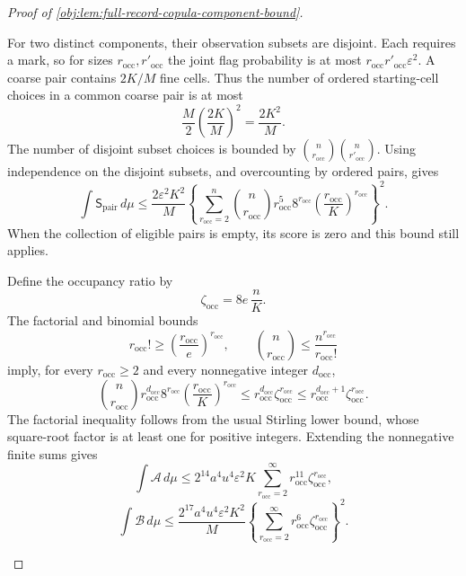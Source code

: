 \documentclass[11pt]{article}
\begin{document}
\begin{proof}[Proof of \cref{obj:lem:full-record-copula-component-bound}]
\begin{enumerate}
For two distinct components, their observation subsets are disjoint. Each requires a mark, so for sizes
\(r_{\mathrm{occ}},r'_{\mathrm{occ}}\) the joint flag probability is at most
\(r_{\mathrm{occ}}r'_{\mathrm{occ}}\varepsilon^2\). A coarse pair contains
\(2K/M\) fine cells. Thus the number of ordered starting-cell choices in a common coarse pair is at most
\[
\frac M2\left(\frac{2K}{M}\right)^2=\frac{2K^2}{M}.
\]
The number of disjoint subset choices is bounded by
\(\binom n{r_{\mathrm{occ}}}\binom n{r'_{\mathrm{occ}}}\).
Using independence on the disjoint subsets, and overcounting by ordered pairs, gives
\[
\int\mathsf S_{\mathrm{pair}}\,d\mu
 \le
 \frac{2\varepsilon^2K^2}{M}
 \left\{
 \sum_{r_{\mathrm{occ}}=2}^{n}
 \binom n{r_{\mathrm{occ}}}
 r_{\mathrm{occ}}^{5}8^{r_{\mathrm{occ}}}
 \left(\frac{r_{\mathrm{occ}}}{K}\right)^{r_{\mathrm{occ}}}
 \right\}^{2}.
\]
When the collection of eligible pairs is empty, its score is zero and this bound still applies.

Define the occupancy ratio by
\[
\zeta_{\mathrm{occ}}=8e\,\frac nK.
\]
The factorial and binomial bounds
\[
r_{\mathrm{occ}}!\ge
 \left(\frac{r_{\mathrm{occ}}}{e}\right)^{r_{\mathrm{occ}}},
\qquad
\binom n{r_{\mathrm{occ}}}
 \le\frac{n^{r_{\mathrm{occ}}}}{r_{\mathrm{occ}}!}
\]
imply, for every \(r_{\mathrm{occ}}\ge2\) and every nonnegative integer
\(d_{\mathrm{occ}}\),
\[
\binom n{r_{\mathrm{occ}}}
 r_{\mathrm{occ}}^{d_{\mathrm{occ}}}8^{r_{\mathrm{occ}}}
 \left(\frac{r_{\mathrm{occ}}}{K}\right)^{r_{\mathrm{occ}}}
 \le
 r_{\mathrm{occ}}^{d_{\mathrm{occ}}}
 \zeta_{\mathrm{occ}}^{r_{\mathrm{occ}}}
 \le
 r_{\mathrm{occ}}^{d_{\mathrm{occ}}+1}
 \zeta_{\mathrm{occ}}^{r_{\mathrm{occ}}}.
\]
The factorial inequality follows from the usual Stirling lower bound, whose square-root factor is at least one for positive integers. Extending the nonnegative finite sums gives
\[
\int\mathcal A\,d\mu
 \le
 2^{14}a^4u^4\varepsilon^2K
 \sum_{r_{\mathrm{occ}}=2}^{\infty}
 r_{\mathrm{occ}}^{11}
 \zeta_{\mathrm{occ}}^{r_{\mathrm{occ}}},
\]
\[
\int\mathcal B\,d\mu
 \le
 \frac{2^{17}a^4u^4\varepsilon^2K^2}{M}
 \left\{
 \sum_{r_{\mathrm{occ}}=2}^{\infty}
 r_{\mathrm{occ}}^{6}
 \zeta_{\mathrm{occ}}^{r_{\mathrm{occ}}}
 \right\}^{2}.
\]


\end{enumerate}
\end{proof}
\end{document}
